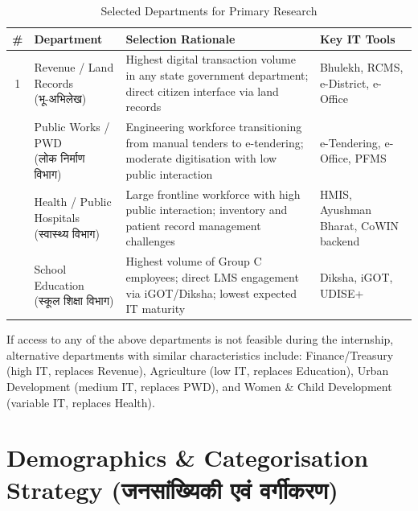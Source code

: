 \documentclass[12pt,a4paper]{article}
\newcommand{\hindi}[1]{{\hindifont #1}}
\begin{document}
\begin{table}[H]
\centering
\caption{Selected Departments for Primary Research}
\label{tab:dept_selection}
\begin{tabularx}{\textwidth}{@{}clXl@{}}
\toprule
\textbf{\#} & \textbf{Department} & \textbf{Selection Rationale} & \textbf{Key IT Tools} \\
\midrule
1 & \makecell[l]{Revenue / Land Records\\(\hindi{भू-अभिलेख})} & Highest digital transaction volume in any state government department; direct citizen interface via land records & Bhulekh, RCMS, e-District, e-Office \\
\addlinespace
2 & \makecell[l]{Public Works / PWD\\(\hindi{लोक निर्माण विभाग})} & Engineering workforce transitioning from manual tenders to e-tendering; moderate digitisation with low public interaction & e-Tendering, e-Office, PFMS \\
\addlinespace
3 & \makecell[l]{Health / Public Hospitals\\(\hindi{स्वास्थ्य विभाग})} & Large frontline workforce with high public interaction; inventory and patient record management challenges & HMIS, Ayushman Bharat, CoWIN backend \\
\addlinespace
4 & \makecell[l]{School Education\\(\hindi{स्कूल शिक्षा विभाग})} & Highest volume of Group C employees; direct LMS engagement via iGOT/Diksha; lowest expected IT maturity & Diksha, iGOT, UDISE+ \\
\bottomrule
\end{tabularx}
\end{table}

\begin{warningbox}
If access to any of the above departments is not feasible during the internship, alternative departments with similar characteristics include: Finance/Treasury (high IT, replaces Revenue), Agriculture (low IT, replaces Education), Urban Development (medium IT, replaces PWD), and Women \& Child Development (variable IT, replaces Health).
\end{warningbox}

\section{Demographics \& Categorisation Strategy (\hindi{जनसांख्यिकी एवं वर्गीकरण})}
\end{document}
